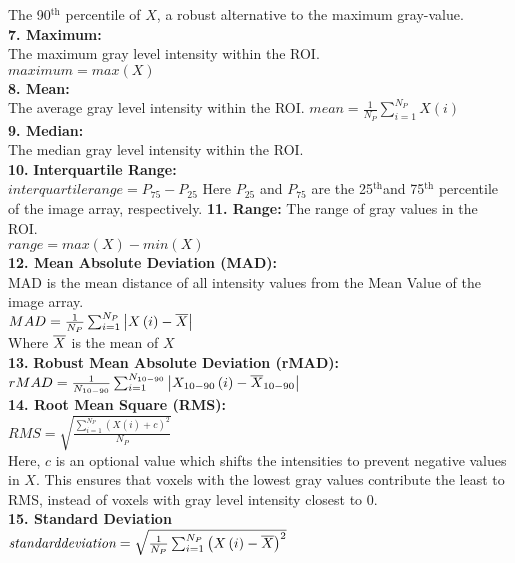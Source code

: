 The 90$^{\mathrm{th}}$ percentile of $X$, a robust alternative to the maximum gray-value. \\
\textbf{7. Maximum:}\\
The maximum gray level intensity within the ROI.\\
$\textit{maximum}=max \left(X\right)$\\
\textbf{8. Mean:}\\
The average gray level intensity within the ROI.\newline
$mean=\frac{1}{N_{P}}\sum _{i=1}^{N_{P}}X\left(i\right)$\\
\textbf{9. Median:}\\
The median gray level intensity within the ROI.\\
\textbf{10.} \textbf{Interquartile Range:}\\
$\textit{interquartilerange}=P_{75}-P_{25}$
Here $P_{25}$ and $P_{75}$ {are the 25}$^{\mathrm{th}}${and 75}$^{\mathrm{th}}$ {percentile of the image array, respectively.}
\textbf{11. Range:}\newline
The range of gray values in the ROI.\\
$\textit{range}=max\left(X\right)-min \left(X\right)$\\
\textbf{12. Mean Absolute Deviation (MAD):}\\
MAD is the mean distance of all intensity values from the Mean Value of the image array.\\
$MAD=\frac{1}{N_{P}}\sum _{i=1}^{N_{P}}\left| X\left(i\right)-\overline{X}\right| $\\
{Where} $\overline{X}$ {is the mean of} $X$\\
\textbf{13.} \textbf{Robust Mean Absolute Deviation (rMAD):}\\
$rMAD=\frac{1}{N_{10-90}}\sum _{i=1}^{N_{10-90}}\left| X_{10-90}\left(i\right)-\overline{X}_{10-90}\right| $\\
\textbf{14. Root Mean Square (RMS):}\\
$RMS=\sqrt{\frac{\sum _{i=1}^{N_{P}}\left(X\left(i\right)+c\right)^{2}}{N_{P}}}$\\
Here, $c$ is an optional value which shifts the intensities to prevent negative values in $X$. This ensures that voxels with the lowest gray values contribute the least to RMS, instead of voxels with gray level intensity closest to 0.\\
\textbf{15. Standard Deviation}\\
$\textit{standarddeviation}=\sqrt{\frac{1}{N_{P}}\sum _{i=1}^{N_{P}}\left(X\left(i\right)-\overline{X}\right)^{2}}$\\
